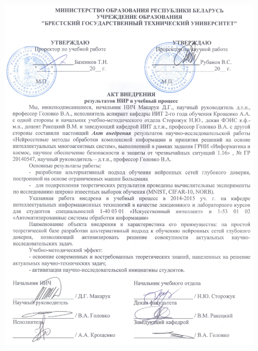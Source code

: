 \begin{figure}[ht]
	\centering
	\includegraphics[height=23cm]{man-source/images/appendix/appendixActs/actBSTU_1.jpg}
\end{figure}

